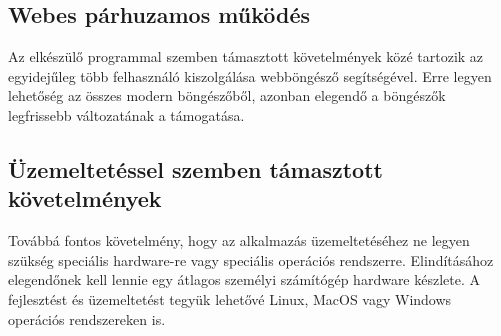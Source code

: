 \subsection{Webes párhuzamos működés}

Az elkészülő programmal szemben támasztott követelmények közé tartozik az egyidejűleg több felhasználó kiszolgálása webböngésző segítségével.
Erre legyen lehetőség az összes modern böngészőből, azonban elegendő a böngészők legfrissebb változatának a támogatása.

\subsection{Üzemeltetéssel szemben támasztott követelmények}
Továbbá fontos követelmény, hogy az alkalmazás üzemeltetéséhez ne legyen szükség speciális hardware-re vagy speciális operációs rendszerre. 
Elindításához elegendőnek kell lennie egy átlagos személyi számítógép hardware készlete. 
A fejlesztést és üzemeltetést tegyük lehetővé Linux, MacOS vagy Windows operációs rendszereken is. 
